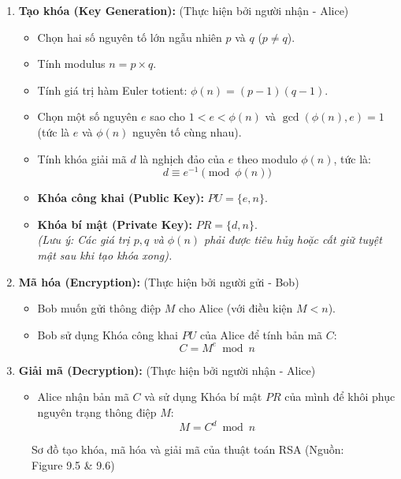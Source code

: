 \begin{enumerate}
    \item \textbf{Tạo khóa (Key Generation):} (Thực hiện bởi người nhận - Alice)
    \begin{itemize}
        \item Chọn hai số nguyên tố lớn ngẫu nhiên $p$ và $q$ ($p \neq q$).
        \item Tính modulus $n = p \times q$.
        \item Tính giá trị hàm Euler totient: $\phi(n) = (p-1)(q-1)$.
        \item Chọn một số nguyên $e$ sao cho $1 < e < \phi(n)$ và $\gcd(\phi(n), e) = 1$ (tức là $e$ và $\phi(n)$ nguyên tố cùng nhau).
        \item Tính khóa giải mã $d$ là nghịch đảo của $e$ theo modulo $\phi(n)$, tức là:
        $$d \equiv e^{-1} \pmod{\phi(n)}$$
        \item \textbf{Khóa công khai (Public Key):} $PU = \{e, n\}$.
        \item \textbf{Khóa bí mật (Private Key):} $PR = \{d, n\}$. \\
        \textit{(Lưu ý: Các giá trị $p, q$ và $\phi(n)$ phải được tiêu hủy hoặc cất giữ tuyệt mật sau khi tạo khóa xong).}
    \end{itemize}

    \item \textbf{Mã hóa (Encryption):} (Thực hiện bởi người gửi - Bob)
    \begin{itemize}
        \item Bob muốn gửi thông điệp $M$ cho Alice (với điều kiện $M < n$).
        \item Bob sử dụng Khóa công khai $PU$ của Alice để tính bản mã $C$:
        $$C = M^e \bmod n$$
    \end{itemize}

    \item \textbf{Giải mã (Decryption):} (Thực hiện bởi người nhận - Alice)
    \begin{itemize}
        \item Alice nhận bản mã $C$ và sử dụng Khóa bí mật $PR$ của mình để khôi phục nguyên trạng thông điệp $M$:
        $$M = C^d \bmod n$$
    \end{itemize}
\end{enumerate}

\begin{figure}[htbp]
    \centering
    \caption{Sơ đồ tạo khóa, mã hóa và giải mã của thuật toán RSA (Nguồn: Figure 9.5 \& 9.6)}
    \label{fig:rsa_algorithm}
\end{figure}

